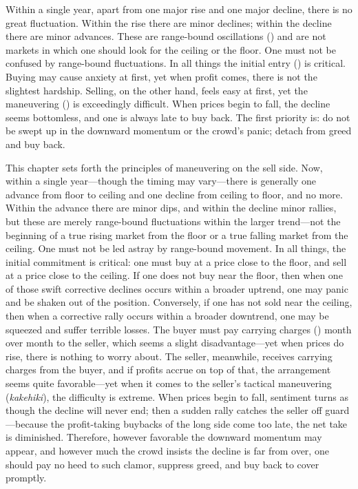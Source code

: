 
\begin{sokyubox}
{\small\itshape\color{sokyubar} }

\medskip
Within a single year, apart from one major rise and one major decline,
there is no great fluctuation. Within the rise there are minor declines;
within the decline there are minor advances. These are range-bound
oscillations () and are not markets in which one
should look for the ceiling or the floor. One must not be confused by
range-bound fluctuations. In all things the initial entry
() is critical. Buying may cause anxiety at first,
yet when profit comes, there is not the slightest hardship. Selling, on
the other hand, feels easy at first, yet the maneuvering
() is exceedingly difficult. When prices begin to
fall, the decline seems bottomless, and one is always late to buy back.
The first priority is: do not be swept up in the downward momentum or
the crowd's panic; detach from greed and buy back.
\end{sokyubox}

\commentary
This chapter sets forth the principles of maneuvering on the sell side.
Now, within a single year---though the timing may vary---there is
generally one advance from floor to ceiling and one decline from ceiling
to floor, and no more. Within the advance there are minor dips, and
within the decline minor rallies, but these are merely range-bound
fluctuations within the larger trend---not the beginning of a true
rising market from the floor or a true falling market from the ceiling.
One must not be led astray by range-bound movement. In all things, the
initial commitment is critical: one must buy at a price close to the
floor, and sell at a price close to the ceiling. If one does not buy
near the floor, then when one of those swift corrective declines occurs
within a broader uptrend, one may panic and be shaken out of the
position. Conversely, if one has not sold near the ceiling, then when a
corrective rally occurs within a broader downtrend, one may be squeezed
and suffer terrible losses. The buyer must pay carrying charges
() month over month to the seller, which seems a
slight disadvantage---yet when prices do rise, there is nothing to worry
about. The seller, meanwhile, receives carrying charges from the buyer,
and if profits accrue on top of that, the arrangement seems quite
favorable---yet when it comes to the seller's tactical maneuvering
(\textit{kakehiki}), the difficulty is extreme. When prices begin to
fall, sentiment turns as though the decline will never end; then a
sudden rally catches the seller off guard---because the profit-taking
buybacks of the long side come too late, the net take is diminished.
Therefore, however favorable the downward momentum may appear, and
however much the crowd insists the decline is far from over, one should
pay no heed to such clamor, suppress greed, and buy back to cover
promptly.

